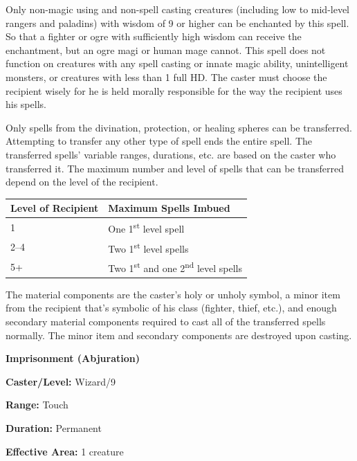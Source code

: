 \begin{multicols}{2}
Only non-magic using and non-spell casting creatures (including low to mid-level rangers and paladins) with wisdom of 9 or higher can be enchanted by this spell.  So that a fighter or ogre with sufficiently high wisdom can receive the enchantment, but an ogre magi or human mage cannot.  This spell does not function on creatures with any spell casting or innate magic ability, unintelligent monsters, or creatures with less than 1 full HD.  The caster must choose the recipient wisely for he is held morally responsible for the way the recipient uses his spells.  

Only spells from the divination, protection, or healing spheres can be transferred.  Attempting to transfer any other type of spell ends the entire spell.  The transferred spells' variable ranges, durations, etc. are based on the caster who transferred it.  The maximum number and level of spells that can be transferred depend on the level of the recipient.

\noindent
\begin{tabular}{|p{}|p{}|}
\hline
Level of Recipient	& Maximum Spells Imbued \\
\hline\hline
\rowcolor[gray]{.9}1	& One 1\textsuperscript{st} level spell \\
2--4	& Two 1\textsuperscript{st} level spells \\
\rowcolor[gray]{.9}5+	& Two 1\textsuperscript{st} and one 2\textsuperscript{nd} level spells \\
\hline
\end{tabular}

The material components are the caster's holy or unholy symbol, a minor item from the recipient that's symbolic of his class (fighter, thief, etc.), and enough secondary material components required to cast all of the transferred spells normally.  The minor item and secondary components are destroyed upon casting.

\vspace{1em}

\noindent
\begin{minipage}{\columnwidth}

\noindent \textbf{Imprisonment (Abjuration)}

\noindent \textbf{Caster/Level:} Wizard/9

\noindent \textbf{Range:} Touch

\noindent \textbf{Duration:} Permanent

\noindent \textbf{Effective Area:} 1 creature


\end{minipage}
\end{multicols}
